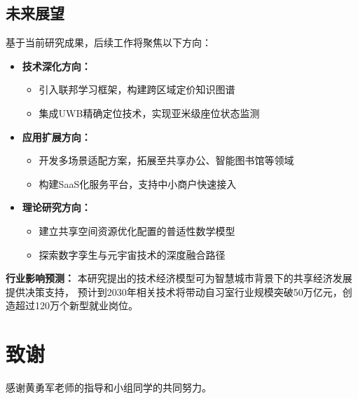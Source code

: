 \documentclass[12pt,a4paper]{IEEEtran} %
\begin{document}
\subsection{未来展望}
基于当前研究成果，后续工作将聚焦以下方向：
\begin{itemize}
  \item \textbf{技术深化方向：}
        \begin{itemize}
          \item 引入联邦学习框架，构建跨区域定价知识图谱
          \item 集成UWB精确定位技术，实现亚米级座位状态监测
        \end{itemize}

  \item \textbf{应用扩展方向：}
        \begin{itemize}
          \item 开发多场景适配方案，拓展至共享办公、智能图书馆等领域
          \item 构建SaaS化服务平台，支持中小商户快速接入
        \end{itemize}

  \item \textbf{理论研究方向：}
        \begin{itemize}
          \item 建立共享空间资源优化配置的普适性数学模型
          \item 探索数字孪生与元宇宙技术的深度融合路径
        \end{itemize}
\end{itemize}

\textbf{行业影响预测：} 本研究提出的技术经济模型可为智慧城市背景下的共享经济发展提供决策支持，
预计到2030年相关技术将带动自习室行业规模突破50万亿元，创造超过120万个新型就业岗位。

\section*{致谢}
感谢黄勇军老师的指导和小组同学的共同努力。

\printbibliography[title=参考文献]
\end{document}
